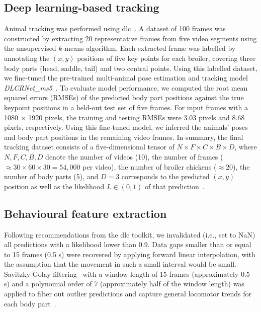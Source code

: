 \subsection{Deep learning-based tracking}

Animal tracking was performed using \gls{dlc}~\cite{mathis2018}. A dataset of 100 frames was constructed by extracting 20 representative frames from five video segments using the unsupervised $k$-means algorithm. Each extracted frame was labelled by annotating the $(x,y)$ positions of five key points for each broiler, covering three body parts (head, saddle, tail) and two central points. Using this labelled dataset, we fine-tuned the pre-trained multi-animal pose estimation and tracking model \emph{DLCRNet\_ms5}~\cite{lauer2022}. To evaluate model performance, we computed the root mean squared errors (RMSEs) of the predicted body part positions against the true keypoint positions in a held-out test set of five frames. For input frames with a 1080 $\times$ 1920 pixels, the training and testing RMSEs were 3.03 pixels and 8.68 pixels, respectively. Using this fine-tuned model, we inferred the animals' poses and body part positions in the remaining video frames. In summary, the final tracking dataset consists of a five-dimensional tensor of $N \times F \times C \times B \times D$, where $N, F, C, B, D$ denote the number of videos (10), the number of frames ($\approx 30 \times 60 \times 30 = 54,000$ per video), the number of broiler chickens ($\approx 20$), the number of body parts (5), and $D = 3$ corresponds to the predicted $(x,y)$ position as well as the likelihood $L \in (0,1)$ of that prediction~\cite{scheidwasser2025c}.

\subsection{Behavioural feature extraction}
\label{methods:chicken_behav_features}

Following recommendations from the \gls{dlc} toolkit, we invalidated (i.e., set to NaN) all predictions with a likelihood lower than 0.9. Data gaps smaller than or equal to 15 frames (0.5 s) were recovered by applying forward linear interpolation, with the assumption that the movement in such a small interval would be small. Savitzky-Golay filtering~\cite{savitzky1964} with a window length of 15 frames (approximately 0.5 s) and a polynomial order of 7 (approximately half of the window length) was applied to filter out outlier predictions and capture general locomotor trends for each body part~\cite{scheidwasser2025c}. 

